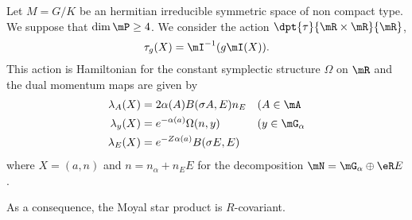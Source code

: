 \begin{proposition}
Let $M=G/K$ be an hermitian irreducible symmetric space of non compact type. We suppose that $\dim\mP\geq 4$. We consider the action $\dpt{ \tau }{  \mR\times\mR  }{ \mR }$,
\[
  \tau_g(X)=\mI^{-1}(g\mI(X)).
\]
This action is Hamiltonian for the constant symplectic structure $\Omega$ on $\mR$ and the dual momentum maps are given by
\begin{subequations}
\begin{align}
\lambda_A(X)&=2\alpha(A)B(\sigma A,E)n_E&&\text{(}A\in \mA\\
\lambda_y(X)&= e^{-\alpha(a)}\Omega(n,y)&&\text{(}y\in\mG_{\alpha}\\
\lambda_E(X)&= e^{-Z\alpha(a)}B(\sigma E,E)
\end{align}
\end{subequations}
where $X=(a,n)$ and $n=n_{\alpha}+n_EE$ for the decomposition $\mN=\mG_{\alpha}\oplus\eR E$.

As a consequence, the Moyal star product is $R$-covariant.

\end{proposition}

